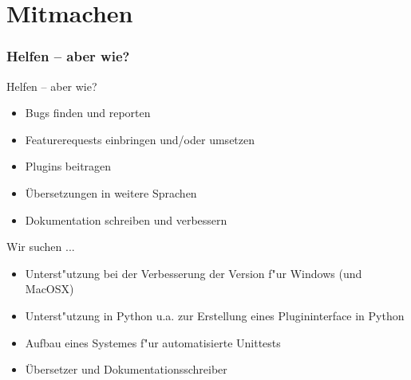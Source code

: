 \documentclass[compress]{beamer}
\begin{document}


\section{Mitmachen}
\begin{frame}
	\frametitle{Helfen -- aber wie?}
	\begin{block}{Helfen -- aber wie?}
		\begin{itemize}
			\item Bugs finden und reporten
			\item Featurerequests einbringen und/oder umsetzen
			\item Plugins beitragen
			\item Übersetzungen in weitere Sprachen
			\item Dokumentation schreiben und verbessern
		\end{itemize}
	\end{block}
	\pause
	\begin{block}{Wir suchen ... }
		\begin{itemize}
			\item Unterst"utzung bei der Verbesserung der Version f"ur
				  Windows (und MacOSX)
			\pause
			\item Unterst"utzung in Python u.a. zur Erstellung eines
				  Plugininterface in Python
			\pause
			\item Aufbau eines Systemes f"ur automatisierte Unittests
			\pause
			\item Übersetzer und Dokumentationsschreiber
			\pause
		\end{itemize}
	\end{block}
\end{frame}
\end{document}
